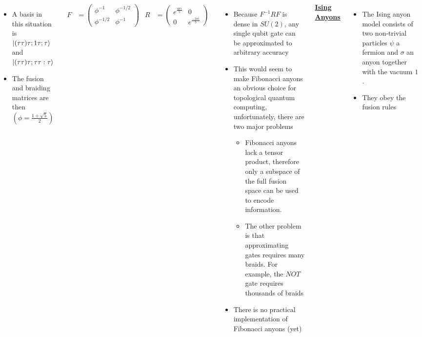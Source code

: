 \documentclass[20pt,,margin=1in,innermargin=-4.5in,blockverticalspace=-0.25in]{tikzposter}
\begin{document}
\begin{columns}
{\begin{itemize}
            \item A basis in this situation is $\ket{(\tau\tau)\tau;1\tau;\tau}$ and $\ket{(\tau\tau)\tau;\tau\tau:\tau}$
            \item The fusion and braiding matrices are then $\left(\phi=\frac{1+\sqrt{5}}{2}\right)$
        \end{itemize}
        \begin{align*}
            F&=\begin{pmatrix}
                \phi^{-1}&\phi^{-1/2}\\\phi^{-1/2}&\phi^{-1}
            \end{pmatrix}&
            R&=\begin{pmatrix}
                e^{\frac{4\pi i}{5}}&0\\0&e^{\frac{-3\pi i}{5}}
            \end{pmatrix}
        \end{align*}
        \begin{itemize}
            \item Because $F^{-1}RF$ is dense in $SU(2)$, any single qubit gate can be approximated to arbitrary accuracy
            \item This would seem to make Fibonacci anyons an obvious choice for topological quantum computing, unfortunately, there are two major problems
            \begin{itemize}
                \item Fibonacci anyons lack a tensor product, therefore only a subspace of the full fusion space can be used to encode information.
                \item The other problem is that approximating gates requires many braids. For example, the $NOT$ gate requires thousands of braids
            \end{itemize}
            \item There is no practical implementation of Fibonacci anyons (yet)
        \end{itemize}
        \begin{center}
            \textbf{\underline{Ising Anyons} \cite{cite:1}}
        \end{center}
        \begin{itemize}
            \item The Ising anyon model consists of two non-trivial particles $\psi$ a fermion and $\sigma$ an anyon together with the vacuum $1$.
            \item They obey the fusion rules

\end{itemize}}
\end{columns}
\end{document}
